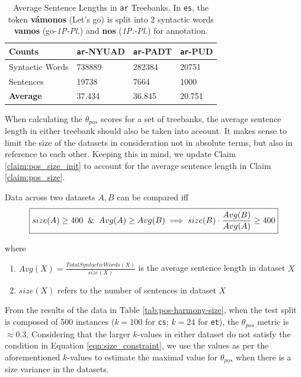 \begin{table}[H]
    \centering
    \begin{tabular}{|l|l|l|l|}
    \hline
    \textbf{Counts} & \texttt{ar}-NYUAD & \texttt{ar}-PADT & \texttt{ar}-PUD \\
    \hline
    Syntactic Words & 738889 & 282384 & 20751 \\
    Sentences & 19738 & 7664 & 1000\\
    \hline
    \textbf{Average} & 37.434 & 36.845 & 20.751\\
    \hline
    \end{tabular}
    \caption[Average Sentence Lengths in \texttt{ar} Treebanks]{Average Sentence Lengths in \texttt{ar} Treebanks. In \texttt{es}, the token \textbf{v\'amonos} (Let's go) is split into 2 syntactic words \textbf{vamos} (go-\textit{1P-Pl.}) and \textbf{nos} (\textit{1P.-Pl.}) for annotation.}
    \label{tab:counts-ar}
\end{table}

When calculating the $\theta_{pos}$ scores for a set of treebanks, the average sentence length in either treebank should also be taken into account. It makes sense to limit the size of the datasets in consideration not in absolute terms, but also in reference to each other. Keeping this in mind, we update Claim \ref{claim:pos_size_init} to account for the average sentence length in Claim \ref{claim:pos_size}.

\begin{claim}
Data across two datasets $A, B$ can be compared iff \\
\begin{equation}
\label{eqn:size_constraint}
    \boxed{size(A) \geq 400 \And Avg(A) \geq Avg(B) \implies size(B) \cdot \frac{Avg(B)}{Avg(A)} \geq 400}
\end{equation}
\label{claim:pos_size}
\end{claim}

where 
\begin{enumerate}
    \item $Avg(X) = \frac{Total Syntactic Words(X)}{size(X)}$ is the average sentence length in dataset $X$
    \item $size(X)$ refers to the number of sentences in dataset $X$
\end{enumerate}

From the results of the data in Table \ref{tab:pos-harmony-size}, when the test split is composed of 500 instances ($k=100$ for \texttt{cs}; $k=24$ for \texttt{et}), the $\theta_{pos}$ metric is $\approx 0.3$. Considering that the larger $k$-values in either dataset do not satisfy the condition in Equation \ref{eqn:size_constraint}, we use the values as per the aforementioned $k$-values to estimate the maximal value for $\theta_{pos}$ when there is a size variance in the datasets.

